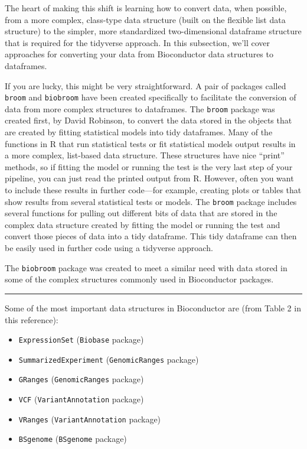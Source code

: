 \documentclass[]{tufte-book}
\providecommand{\tightlist}{%
  \setlength{\itemsep}{0pt}\setlength{\parskip}{0pt}}
\begin{document}
The heart of making this shift is learning how to convert data, when possible,
from a more complex, class-type data structure (built on the flexible list
data structure) to the simpler, more standardized two-dimensional dataframe
structure that is required for the tidyverse approach. In this subsection, we'll
cover approaches for converting your data from Bioconductor data structures to
dataframes.

If you are lucky, this might be very straightforward. A pair of packages called
\texttt{broom} and \texttt{biobroom} have been created specifically to facilitate the conversion
of data from more complex structures to dataframes. The \texttt{broom} package was
created first, by David Robinson, to convert the data stored in the objects that
are created by fitting statistical models into tidy dataframes. Many of the functions
in R that run statistical tests or fit statistical models output results in a
more complex, list-based data structure. These structures have nice ``print'' methods,
so if fitting the model or running the test is the very last step of your pipeline,
you can just read the printed output from R. However, often you want to include
these results in further code---for example, creating plots or tables that show
results from several statistical tests or models. The \texttt{broom} package includes
several functions for pulling out different bits of data that are stored in the
complex data structure created by fitting the model or running the test and convert
those pieces of data into a tidy dataframe. This tidy dataframe can then be
easily used in further code using a tidyverse approach.

The \texttt{biobroom} package was created to meet a similar need with data stored in some
of the complex structures commonly used in Bioconductor packages.

\begin{center}\rule{0.5\linewidth}{0.5pt}\end{center}

Some of the most important data structures in Bioconductor are \citep{huber2015orchestrating} (from Table 2 in this reference):

\begin{itemize}
\tightlist
\item
  \texttt{ExpressionSet} (\texttt{Biobase} package)
\item
  \texttt{SummarizedExperiment} (\texttt{GenomicRanges} package)
\item
  \texttt{GRanges} (\texttt{GenomicRanges} package)
\item
  \texttt{VCF} (\texttt{VariantAnnotation} package)
\item
  \texttt{VRanges} (\texttt{VariantAnnotation} package)
\item
  \texttt{BSgenome} (\texttt{BSgenome} package)
\end{itemize}
\end{document}
